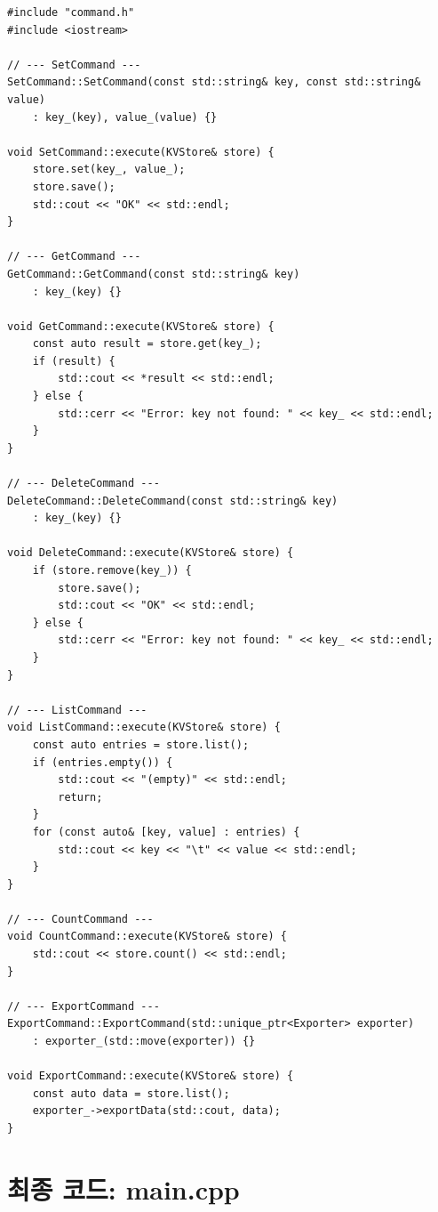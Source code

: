 \documentclass[11pt,a4paper]{book}
\newcommand{\file}[1]{\texttt{#1}}
\begin{document}
\begin{lstlisting}[style=cpp,title={\file{src/command.cpp} (최종)}]
#include "command.h"
#include <iostream>

// --- SetCommand ---
SetCommand::SetCommand(const std::string& key, const std::string& value)
    : key_(key), value_(value) {}

void SetCommand::execute(KVStore& store) {
    store.set(key_, value_);
    store.save();
    std::cout << "OK" << std::endl;
}

// --- GetCommand ---
GetCommand::GetCommand(const std::string& key)
    : key_(key) {}

void GetCommand::execute(KVStore& store) {
    const auto result = store.get(key_);
    if (result) {
        std::cout << *result << std::endl;
    } else {
        std::cerr << "Error: key not found: " << key_ << std::endl;
    }
}

// --- DeleteCommand ---
DeleteCommand::DeleteCommand(const std::string& key)
    : key_(key) {}

void DeleteCommand::execute(KVStore& store) {
    if (store.remove(key_)) {
        store.save();
        std::cout << "OK" << std::endl;
    } else {
        std::cerr << "Error: key not found: " << key_ << std::endl;
    }
}

// --- ListCommand ---
void ListCommand::execute(KVStore& store) {
    const auto entries = store.list();
    if (entries.empty()) {
        std::cout << "(empty)" << std::endl;
        return;
    }
    for (const auto& [key, value] : entries) {
        std::cout << key << "\t" << value << std::endl;
    }
}

// --- CountCommand ---
void CountCommand::execute(KVStore& store) {
    std::cout << store.count() << std::endl;
}

// --- ExportCommand ---
ExportCommand::ExportCommand(std::unique_ptr<Exporter> exporter)
    : exporter_(std::move(exporter)) {}

void ExportCommand::execute(KVStore& store) {
    const auto data = store.list();
    exporter_->exportData(std::cout, data);
}
\end{lstlisting}

\section{최종 코드: main.cpp}
\end{document}
